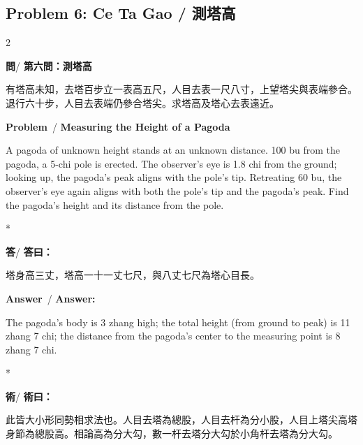 \documentclass[11pt,a4paper]{article}
\newcommand{\wen}{\textbf{\color{sectioncolor}問}}
\newcommand{\da}{\textbf{\color{answercolor}答}}
\newcommand{\shu}{\textbf{\color{methodcolor}術}}
\newcommand{\prb}{\textbf{\color{sectioncolor}Problem}}
\newcommand{\ans}{\textbf{\color{answercolor}Answer}}
\begin{document}
\vspace{1em}

\subsection*{Problem 6: Ce Ta Gao / 測塔高}

\begin{paracol}{2}

\begin{leftcolumn*}
\wen / \textbf{第六問：測塔高}

有塔高未知，去塔百步立一表高五尺，人目去表一尺八寸，上望塔尖與表端參合。退行六十步，人目去表端仍參合塔尖。求塔高及塔心去表遠近。
\end{leftcolumn*}

\begin{rightcolumn}
\prb\ / \textbf{Measuring the Height of a Pagoda}

A pagoda of unknown height stands at an unknown 
distance. 100 bu from the pagoda, a 5-chi pole is erected. The observer's 
eye is 1.8 chi from the ground; looking up, the pagoda's peak aligns 
with the pole's tip. Retreating 60 bu, the observer's eye again aligns 
with both the pole's tip and the pagoda's peak. Find the pagoda's height 
and its distance from the pole.
\end{rightcolumn}

\switchcolumn[0]*

\begin{leftcolumn*}
\da / \textbf{答曰：}

塔身高三丈，塔高一十一丈七尺，與八丈七尺為塔心目長。
\end{leftcolumn*}

\begin{rightcolumn}
\ans\ / \textbf{Answer:}

The pagoda's body is 3 zhang high; the total height 
(from ground to peak) is 11 zhang 7 chi; the distance from the pagoda's 
center to the measuring point is 8 zhang 7 chi.
\end{rightcolumn}

\switchcolumn[0]*

\begin{leftcolumn*}
\shu / \textbf{術曰：}

此皆大小形同勢相求法也。人目去塔為總股，人目去杆為分小股，人目上塔尖高塔身節為總股高。相論高為分大勾，數一杆去塔分大勾於小角杆去塔為分大勾。
\end{leftcolumn*}


\end{paracol}
\end{document}
